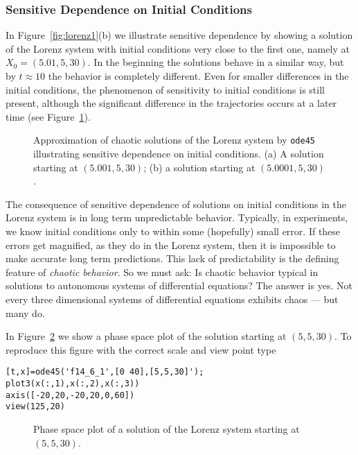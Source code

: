 \documentclass{ximera}
\begin{document}
\subsubsection*{Sensitive Dependence on Initial Conditions}

In Figure~\ref{fig:lorenz1}(b) we illustrate sensitive dependence by showing  
a solution of the Lorenz system with initial conditions 
very close to the first one, namely at $X_0=(5.01,5,30)$.  In the beginning 
the solutions behave in a similar way, but by $t\approx 10$ the behavior is 
completely different.  Even for smaller 
differences in the initial conditions, the phenomenon of sensitivity to 
initial conditions is still present, although the significant difference in 
the trajectories occurs at a later time (see Figure~\ref{fig:lorenz2}).  

\begin{figure}[htb]
   \centerline{%
   }
   \caption{Approximation of chaotic solutions of the Lorenz system by 
	{\tt ode45} illustrating sensitive dependence on initial conditions.
 	 (a) A solution starting at $(5.001,5,30)$;
  	 (b) a solution starting at $(5.0001,5,30)$.}
   \label{fig:lorenz2}
\end{figure}

The consequence of sensitive dependence of solutions on initial conditions in 
the Lorenz system is in long term unpredictable behavior.  Typically, in
experiments, we know initial conditions only to within some (hopefully) small
error.  If these errors get magnified, as they do in the Lorenz system, then
it is impossible to make accurate long term predictions.  This lack of
predictability is the defining feature of {\em chaotic behavior}.
  So we must ask:  Is chaotic behavior typical in solutions to
autonomous systems of differential equations?  The answer is yes.  Not every
three dimensional systems of differential equations exhibits chaos --- but
many do.  

In Figure~\ref{fig:lorenz3} we show a phase space plot of the
solution starting at $(5,5,30)$.  To reproduce this figure with the 
correct scale and view point type
\begin{verbatim}
[t,x]=ode45('f14_6_1',[0 40],[5,5,30]');
plot3(x(:,1),x(:,2),x(:,3))
axis([-20,20,-20,20,0,60])
view(125,20)
\end{verbatim}
\begin{figure}[htb]
   \centerline{%
   }
   \caption{Phase space plot of a solution of the Lorenz system
   starting at $(5,5,30)$.}
   \label{fig:lorenz3}
\end{figure}
\end{document}
